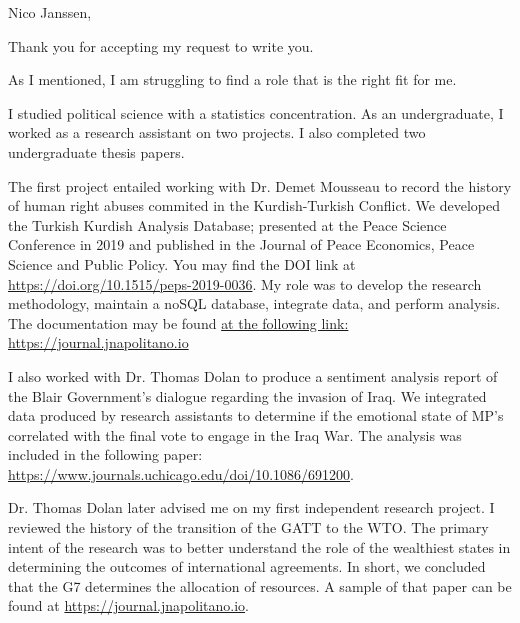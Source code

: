 \documentclass{ExpressiveCoverLetter}
\begin{document}
\coverletterheader[
    firstname=Justin,
    middleinitial=B,
    lastname=Napolitano, 
    email=justin@jnapolitano.io, 
    phone=832-299-0372,            
    city=Houston,
    state=Texas
]


Nico Janssen, 

\begin{flushleft}
\begin{normalsize} 

    \singlespacing 

    Thank you for accepting my request to write you.  
			
    As I mentioned, I am struggling to find a role that is the right fit for me.  
    
    I studied political science with a statistics concentration.  As an undergraduate, I worked as a research assistant on two projects.  I also completed two undergraduate thesis papers. 

    The first project entailed working with Dr. Demet Mousseau to record the history of human right abuses commited in the Kurdish-Turkish Conflict. We developed the Turkish Kurdish Analysis Database; presented at the Peace Science Conference in 2019 and published in the Journal of Peace Economics, Peace Science and Public Policy.  You may find the DOI link at \href{https://doi.org/10.1515/peps-2019-0036}{https://doi.org/10.1515/peps-2019-0036}. My role was to develop the research methodology, maintain a noSQL database, integrate data, and perform analysis.  The documentation may be found \href{https://journal.jnapolitano.io/parts/articles/project-kurdish-conflict/index.html}{at the following link: https://journal.jnapolitano.io}

    I also worked with Dr. Thomas Dolan to produce a sentiment analysis report of the Blair Government's dialogue regarding the invasion of Iraq.  We integrated data produced by research assistants to determine if the emotional state of MP's correlated with the final vote to engage in the Iraq War. The analysis was included in the following paper: \href{https://www.journals.uchicago.edu/doi/10.1086/691200}{https://www.journals.uchicago.edu/doi/10.1086/691200}.   
    
    Dr. Thomas Dolan later advised me on my first independent research project.  I reviewed the history of the transition of the GATT to the WTO.  The primary intent of the research was to better understand the role of the wealthiest states in determining the outcomes of international agreements.  In short, we concluded that the G7 determines the allocation of resources.  A sample of that paper can be found at \href{https://journal.jnapolitano.io/parts/articles/project-evolution-of-ngos/index.html}{https://journal.jnapolitano.io}.
    

\end{normalsize}
\end{flushleft}
\end{document}
